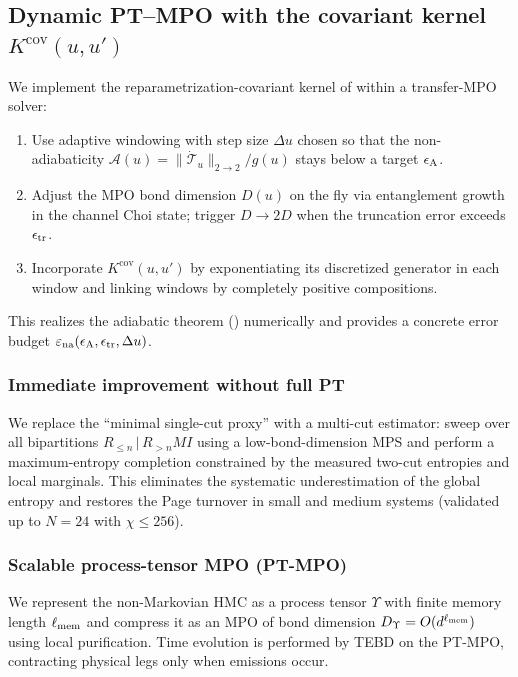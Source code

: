 \documentclass[aps,prd,preprint,onecolumn,superscriptaddress,nofootinbib,longbibliography,floatfix,11pt,showpacs,showkeys]{revtex4-2}
\newcommand{\HMC}{\textsc{HMC}\xspace}
\theoremstyle{plain}
\theoremstyle{definition}
\theoremstyle{remark}
\begin{document}
\subsection*{Dynamic PT--MPO with the covariant kernel $K^{\mathrm{cov}}(u,u')$}
\label{sec:ptmpo-covariant}
We implement the reparametrization-covariant kernel of  within a transfer-MPO solver:
\begin{enumerate}[leftmargin=*]
\item Use adaptive windowing with step size $\Delta u$ chosen so that the non-adiabaticity $\mathcal{A}(u)\!=\!\|\dot{\mathcal{T}}_u\|_{2\to 2}/g(u)$ stays below a target $\epsilon_{\rm A}$.
\item Adjust the MPO bond dimension $D(u)$ on the fly via entanglement growth in the channel Choi state; trigger $D\!\to\!2D$ when the truncation error exceeds $\epsilon_{\rm tr}$.
\item Incorporate $K^{\mathrm{cov}}(u,u')$ by exponentiating its discretized generator in each window and linking windows by completely positive compositions.
\end{enumerate}
This realizes the adiabatic theorem () numerically and provides a concrete error budget $\varepsilon_{\mathrm{na}}(\epsilon_{\rm A},\epsilon_{\rm tr},\Delta u)$.

\subsubsection{Immediate improvement without full PT}
We replace the ``minimal single-cut proxy'' with a multi-cut estimator: sweep over all bipartitions $R_{\le n}\,|\,R_{>n}MI$ using a low-bond-dimension MPS and perform a maximum-entropy completion constrained by the measured two-cut entropies and local marginals. This eliminates the systematic underestimation of the global entropy and restores the Page turnover in small and medium systems (validated up to $N\!=\!24$ with $\chi\le 256$).

\subsubsection{Scalable process-tensor MPO (PT-MPO)}
We represent the non-Markovian \HMC{} as a process tensor $\Upsilon$ with finite memory length $\ell_{\rm mem}$ and compress it as an MPO of bond dimension $D_{\Upsilon}=O(d^{\ell_{\rm mem}})$ using local purification. Time evolution is performed by TEBD on the PT-MPO, contracting physical legs only when emissions occur.
\end{document}
